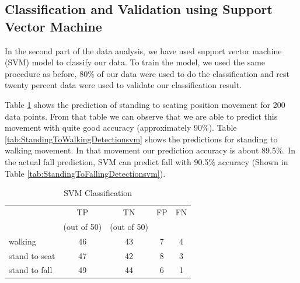 \documentclass[letterpaper]{article}
\begin{document}
\subsection{Classification and Validation using Support Vector Machine}

In the second part of the data analysis, we have used support vector machine (SVM) model
to classify our data. To train the model, we used the same procedure as before, 80\% of
our data were used to do the classification and rest twenty percent data were used to validate our
classification result.

Table \ref{tab:StandingToSeatingDetectionsvm} shows the prediction of standing to seating position
movement for 200 data points. From that table we can observe that we are able to predict this
movement with quite good accuracy (approximately 90\%). Table
\ref{tab:StandingToWalkingDetectionsvm} shows the predictions for standing to
walking movement. In that movement our prediction accuracy is about 89.5\%. In the actual fall
prediction, SVM can predict fall with 90.5\% accuracy (Shown in Table
\ref{tab:StandingToFallingDetectionsvm}).




\begin{table}[!ht]
\caption{SVM Classification}
	\label{tab:StandingToSeatingDetectionsvm}
	\centering
		\begin{tabular} {l |c |c |c|c}
			&TP  &	TN  &	FP &	FN \\
			&(out of 50) & (out of 50)& & \\ \hline
			walking	& 46	& 43	& 7	& 4 \\ \hline
			stand to seat	& 47	& 42	& 8 & 	3	 \\ \hline 
			stand to fall	& 49	& 44	& 6	& 1	 \\ \hline
		\end{tabular}
\end{table}
%
%
\end{document}
